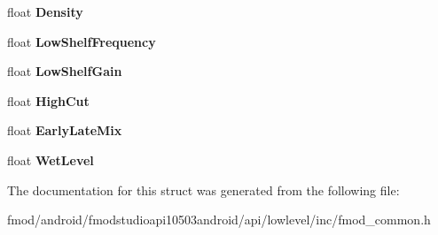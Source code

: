 \begin{DoxyCompactItemize}
\item 
\hypertarget{struct_f_m_o_d___r_e_v_e_r_b___p_r_o_p_e_r_t_i_e_s_a3672d989ace5e2dc4450b7677fa83f75}{float {\bfseries Density}}\label{struct_f_m_o_d___r_e_v_e_r_b___p_r_o_p_e_r_t_i_e_s_a3672d989ace5e2dc4450b7677fa83f75}

\item 
\hypertarget{struct_f_m_o_d___r_e_v_e_r_b___p_r_o_p_e_r_t_i_e_s_af3531e00fb03228d8b47c82f7390cd32}{float {\bfseries Low\+Shelf\+Frequency}}\label{struct_f_m_o_d___r_e_v_e_r_b___p_r_o_p_e_r_t_i_e_s_af3531e00fb03228d8b47c82f7390cd32}

\item 
\hypertarget{struct_f_m_o_d___r_e_v_e_r_b___p_r_o_p_e_r_t_i_e_s_a62d648ba78fd94ee54f61e5eebbe9bfb}{float {\bfseries Low\+Shelf\+Gain}}\label{struct_f_m_o_d___r_e_v_e_r_b___p_r_o_p_e_r_t_i_e_s_a62d648ba78fd94ee54f61e5eebbe9bfb}

\item 
\hypertarget{struct_f_m_o_d___r_e_v_e_r_b___p_r_o_p_e_r_t_i_e_s_ade1f9babf2907d9e1d6e17e5cbdc6d38}{float {\bfseries High\+Cut}}\label{struct_f_m_o_d___r_e_v_e_r_b___p_r_o_p_e_r_t_i_e_s_ade1f9babf2907d9e1d6e17e5cbdc6d38}

\item 
\hypertarget{struct_f_m_o_d___r_e_v_e_r_b___p_r_o_p_e_r_t_i_e_s_af0982bfac28a7ca7c437c41d4389d1c8}{float {\bfseries Early\+Late\+Mix}}\label{struct_f_m_o_d___r_e_v_e_r_b___p_r_o_p_e_r_t_i_e_s_af0982bfac28a7ca7c437c41d4389d1c8}

\item 
\hypertarget{struct_f_m_o_d___r_e_v_e_r_b___p_r_o_p_e_r_t_i_e_s_abf5c49519616b2423fdb6447756c6380}{float {\bfseries Wet\+Level}}\label{struct_f_m_o_d___r_e_v_e_r_b___p_r_o_p_e_r_t_i_e_s_abf5c49519616b2423fdb6447756c6380}

\end{DoxyCompactItemize}


The documentation for this struct was generated from the following file\+:\begin{DoxyCompactItemize}
\item 
fmod/android/fmodstudioapi10503android/api/lowlevel/inc/fmod\+\_\+common.\+h\end{DoxyCompactItemize}
